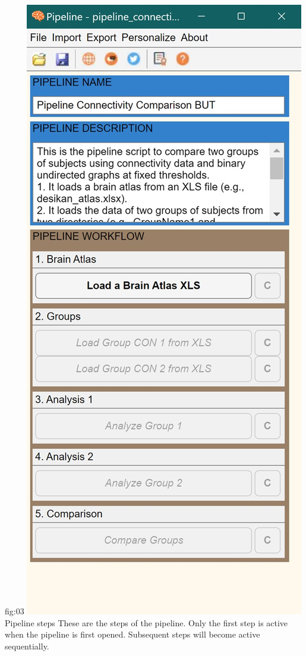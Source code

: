 \documentclass[justified]{tufte-handout}
\begin{document}
{fig:03}
{
	\includegraphics{fig03.jpg}
}
{Pipeline steps}
{
	These are the steps of the pipeline. Only the first step is active when the pipeline is first opened. Subsequent steps will become active sequentially.
}
\end{document}
